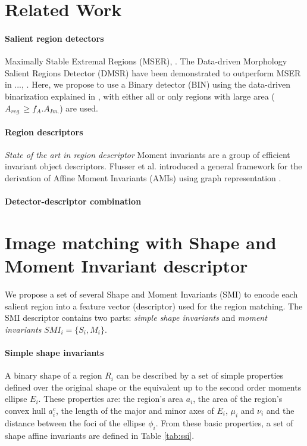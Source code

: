 \documentclass[a4paper,11pt]{article}
\begin{document}
\section{Related Work}


\paragraph{Salient region detectors}
Maximally Stable Extremal Regions (MSER), \cite{Matas2002BMVC}.
The Data-driven Morphology Salient Regions Detector (DMSR) have been demonstrated to outperform MSER in ..., \cite{Ranguelova2016AICCSA}. Here, we propose to use a Binary detector (BIN) using the data-driven binarization explained in \cite{Ranguelova2016AICCSA}, with either all or only regions with large area ($A_{reg.} \ge f_A.A_{Im.}$) are used.

\paragraph{Region descriptors}
{\em State of the art in region descriptor}
Moment invariants are a group of efficient invariant object descriptors. Flusser et al. introduced a general framework for the derivation of Affine Moment Invariants (AMIs) using graph representation \cite{FLUSSER1993167, SukF04, Flusser09a}.

\paragraph{Detector-descriptor combination}

\section{Image matching with Shape and Moment Invariant descriptor}
We propose a set of several Shape and Moment Invariants (SMI) to encode each salient region into a feature vector (descriptor) used for the region matching. The SMI descriptor contains two parts: {\em simple shape invariants}  and {\em moment invariants} $SMI_i = \{S_i, M_i\}$.

\paragraph{Simple shape invariants}
A binary shape of a region $R_i$ can be described by a set of simple properties defined over the original shape or the equivalent up to the second order moments ellipse $E_i$. These properties are: the region's area $a_i$, the area of the region's convex hull $a^c_i$, the length of the major and minor axes of $E_i$, $\mu_i$ and $\nu_i$ and the distance between the foci of the ellipse $\phi_i$. From these basic properties, a set of shape affine invariants are defined in Table \ref{tab:ssi}.   
\end{document}
